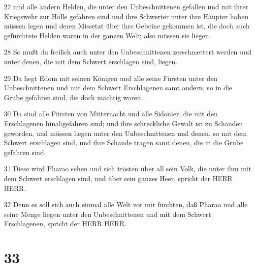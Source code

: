 \par 27 und alle andern Helden, die unter den Unbeschnittenen gefallen und mit ihrer Kriegswehr zur Hölle gefahren sind und ihre Schwerter unter ihre Häupter haben müssen legen und deren Missetat über ihre Gebeine gekommen ist, die doch auch gefürchtete Helden waren in der ganzen Welt; also müssen sie liegen.
\par 28 So mußt du freilich auch unter den Unbeschnittenen zerschmettert werden und unter denen, die mit dem Schwert erschlagen sind, liegen.
\par 29 Da liegt Edom mit seinen Königen und alle seine Fürsten unter den Unbeschnittenen und mit dem Schwert Erschlagenen samt andern, so in die Grube gefahren sind, die doch mächtig waren.
\par 30 Da sind alle Fürsten von Mitternacht und alle Sidonier, die mit den Erschlagenen hinabgefahren sind; und ihre schreckliche Gewalt ist zu Schanden geworden, und müssen liegen unter den Unbeschnittenen und denen, so mit dem Schwert erschlagen sind, und ihre Schande tragen samt denen, die in die Grube gefahren sind.
\par 31 Diese wird Pharao sehen und sich trösten über all sein Volk, die unter ihm mit dem Schwert erschlagen sind, und über sein ganzes Heer, spricht der HERR HERR.
\par 32 Denn es soll sich auch einmal alle Welt vor mir fürchten, daß Pharao und alle seine Menge liegen unter den Unbeschnittenen und mit dem Schwert Erschlagenen, spricht der HERR HERR.

\chapter{33}

